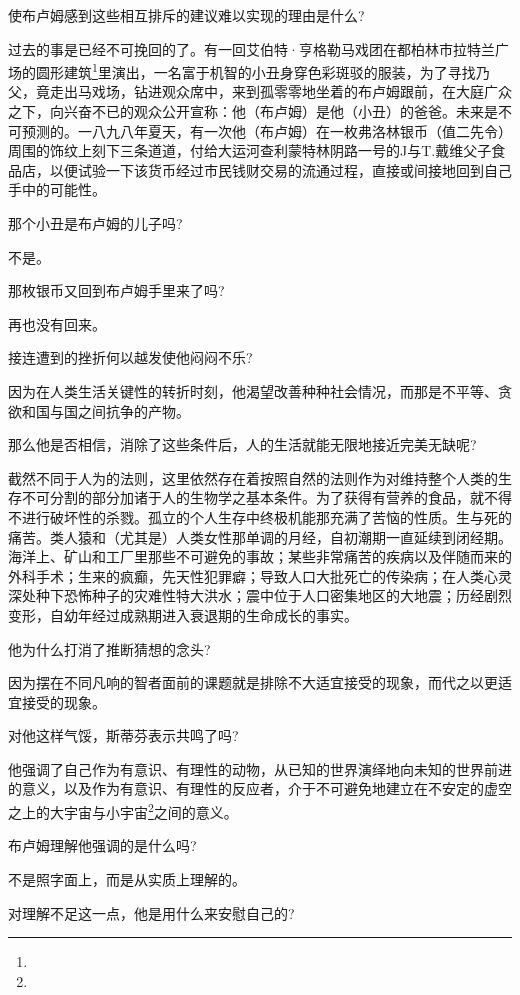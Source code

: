 \par 使布卢姆感到这些相互排斥的建议难以实现的理由是什么?
\par 过去的事是已经不可挽回的了。有一回艾伯特·亨格勒马戏团在都柏林市拉特兰广场的圆形建筑\footnote{}里演出，一名富于机智的小丑身穿色彩斑驳的服装，为了寻找乃父，竟走出马戏场，钻进观众席中，来到孤零零地坐着的布卢姆跟前，在大庭广众之下，向兴奋不已的观众公开宣称：他（布卢姆）是他（小丑）的爸爸。未来是不可预测的。一八九八年夏天，有一次他（布卢姆）在一枚弗洛林银币（值二先令）周围的饰纹上刻下三条道道，付给大运河查利蒙特林阴路一号的J与T.戴维父子食品店，以便试验一下该货币经过市民钱财交易的流通过程，直接或间接地回到自己手中的可能性。
\par 那个小丑是布卢姆的儿子吗?
\par 不是。
\par 那枚银币又回到布卢姆手里来了吗?
\par 再也没有回来。
\par 接连遭到的挫折何以越发使他闷闷不乐?
\par 因为在人类生活关键性的转折时刻，他渴望改善种种社会情况，而那是不平等、贪欲和国与国之间抗争的产物。
\par 那么他是否相信，消除了这些条件后，人的生活就能无限地接近完美无缺呢?
\par 截然不同于人为的法则，这里依然存在着按照自然的法则作为对维持整个人类的生存不可分割的部分加诸于人的生物学之基本条件。为了获得有营养的食品，就不得不进行破坏性的杀戮。孤立的个人生存中终极机能那充满了苦恼的性质。生与死的痛苦。类人猿和（尤其是）人类女性那单调的月经，自初潮期一直延续到闭经期。海洋上、矿山和工厂里那些不可避免的事故；某些非常痛苦的疾病以及伴随而来的外科手术；生来的疯癫，先天性犯罪癖；导致人口大批死亡的传染病；在人类心灵深处种下恐怖种子的灾难性特大洪水；震中位于人口密集地区的大地震；历经剧烈变形，自幼年经过成熟期进入衰退期的生命成长的事实。
\par 他为什么打消了推断猜想的念头?
\par 因为摆在不同凡响的智者面前的课题就是排除不大适宜接受的现象，而代之以更适宜接受的现象。
\par 对他这样气馁，斯蒂芬表示共鸣了吗?
\par 他强调了自己作为有意识、有理性的动物，从已知的世界演绎地向未知的世界前进的意义，以及作为有意识、有理性的反应者，介于不可避免地建立在不安定的虚空之上的大宇宙与小宇宙\footnote{}之间的意义。
\par 布卢姆理解他强调的是什么吗?
\par 不是照字面上，而是从实质上理解的。
\par 对理解不足这一点，他是用什么来安慰自己的?
